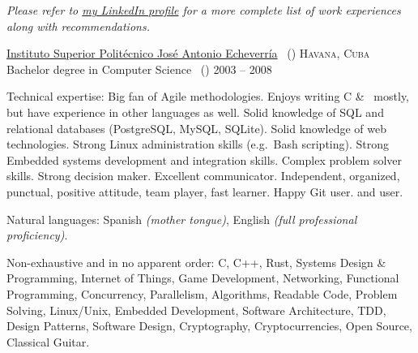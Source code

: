 \documentclass[10pt,a4paper]{article}
\begin{document}
\vspace{-0.2em}
\begin{center}
	\emph{\small Please refer to \href{http://www.linkedin.com/in/jvillasante}{my LinkedIn profile} for a more complete list of work experiences along with recommendations.}
\end{center}

\spacedhrule{-0.2em}{-0.4em}


\headedsection
{\href{http://cujae.edu.cu}{Instituto Superior Polit\'ecnico Jos\'e Antonio Echeverr\'ia} \textnormal{~()}}
{\textsc{Havana, Cuba}} {%
	\headedsubsection
	{Bachelor degree in Computer Science \textnormal{~()}}
	{2003 -- 2008}
	{}
}

\spacedhrule{0.5em}{-0.4em}


\inlineheadsection  %
{Technical expertise:}
{Big fan of Agile methodologies. Enjoys writing C \& \nsp\CPP\nsp\, mostly, but have experience in other languages as well. Solid knowledge of SQL and relational databases (PostgreSQL, MySQL, SQLite). Solid knowledge of web technologies. Strong Linux administration skills (e.g.\ Bash scripting). Strong Embedded systems development and integration skills. Complex problem solver skills. Strong decision maker. Excellent communicator. Independent, organized, punctual, positive attitude, team player, fast learner. Happy Git user.  and  user.}

\vspace{0.5em}
\inlineheadsection
{Natural languages:}
{Spanish \emph{(mother tongue)}, English \emph{(full professional proficiency)}.}

\spacedhrule{1.6em}{-0.4em}


\inlineheadsection
{Non-exhaustive and in no apparent order:}
{C, C++, Rust, Systems Design \& Programming, Internet of Things, Game Development, Networking, Functional Programming, Concurrency, Parallelism, Algorithms, Readable Code, Problem Solving, Linux/Unix, Embedded Development, Software Architecture, TDD, Design Patterns, Software Design, Cryptography, Cryptocurrencies, Open Source, Classical Guitar.}
\end{document}
